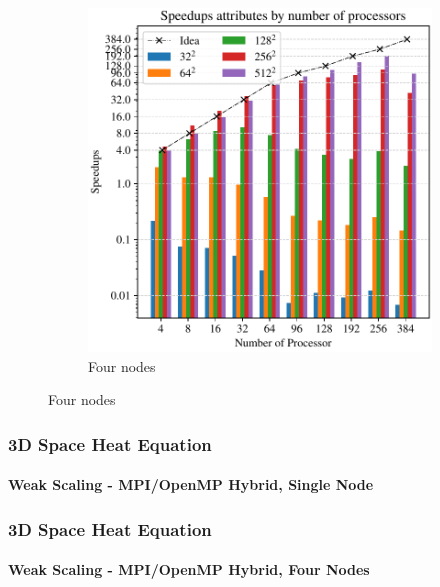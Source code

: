 \begin{frame}
\begin{figure}
\begin{subfigure}{0.42\textwidth}
      \includegraphics[width=\textwidth]{figure/FIG_Benchmark_pure_mpi_3D_multi_nodes.pdf}
      \caption{Four nodes}
      \label{FIG:Benchmark:Pure_MPI_Multi_Node_3D}
    \end{subfigure}
    \label{FIG:Benchmark:Pure_MPI_Node_3D}
  \end{figure}
  
\end{frame}



\begin{frame}
  \frametitle{3D Space Heat Equation}
  \framesubtitle{Weak Scaling - MPI/OpenMP Hybrid, Single Node}


  

\end{frame}


\begin{frame}
  \frametitle{3D Space Heat Equation}
  \framesubtitle{Weak Scaling - MPI/OpenMP Hybrid, Four Nodes}
  

  

\end{frame}




